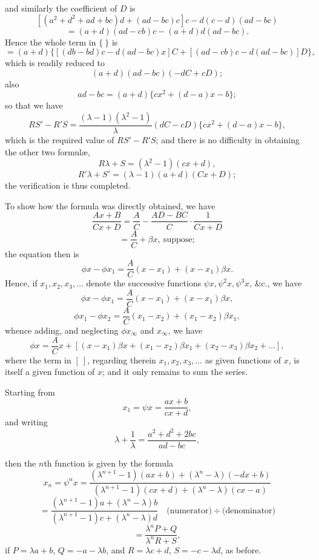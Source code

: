 \documentclass[11pt,a4paper]{article}
\begin{document}
\newpage


and similarly the coefficient of $D$ is
\[
[(a^{2} + d^{2} + ad + bc)d + (ad - bc)c]c - d(c - d)(ad - bc)
\]
\[
= (a + d)(ad - cb)c - (a + d)d(ad - bc).
\]
Hence the whole term in $\{\ \}$ is
\[
= (a + d)\{[(db - bd)c - d(ad - bc)x]C + [(ad - cb)c - d(ad - bc)]D\},
\]
which is readily reduced to
\[
(a + d)(ad - bc)(-dC + cD);
\]
also
\[
ad - bc = (a + d)\{cx^{2} + (d - a)x - b\};
\]
so that we have
\[
RS' - R'S = \frac{(\lambda - 1)(\lambda^{2} - 1)}{\lambda}(dC - cD)\{cx^{2} + (d - a)x - b\},
\]
which is the required value of $RS' - R'S$; and there is no difficulty in obtaining the other two formul\ae{},
\[
R\lambda + S = (\lambda^{2} - 1)(cx + d),
\]
\[
R'\lambda + S' = (\lambda - 1)(a + d)(Cx + D);
\]
the verification is thus completed.

\medskip

To show how the formula was directly obtained, we have
\[
\frac{Ax + B}{Cx + D} = \frac{A}{C} - \frac{AD - BC}{C}\cdot\frac{1}{Cx + D}
\]
\[
= \frac{A}{C} + \beta x,\ \text{suppose};
\]
the equation then is
\[
\phi x - \phi x_{1} = \frac{A}{C}(x - x_{1}) + (x - x_{1})\beta x.
\]
Hence, if $x_{1}, x_{2}, x_{3}, \ldots$ denote the successive functions $\psi x, \psi^{2}x, \psi^{3}x$, \&c., we have
\[
\phi x - \phi x_{1} = \frac{A}{C}(x - x_{1}) + (x - x_{1})\beta x,
\]
\[
\phi x_{1} - \phi x_{2} = \frac{A}{C}(x_{1} - x_{2}) + (x_{1} - x_{2})\beta x_{1},
\]
whence adding, and neglecting $\phi x_{\infty}$ and $x_{\infty}$, we have
\[
\phi x = \frac{A}{C}x + [(x - x_{1})\beta x + (x_{1} - x_{2})\beta x_{1} + (x_{2} - x_{3})\beta x_{2} + \ldots],
\]
where the term in $[\ ]$, regarding therein $x_{1}, x_{2}, x_{3}, \ldots$ as given functions of $x$, is itself a given function of $x$; and it only remains to sum the series.

\medskip

Starting from
\[
x_{1} = \psi x = \frac{ax + b}{cx + d},
\]
and writing
\[
\lambda + \frac{1}{\lambda} = \frac{a^{2} + d^{2} + 2bc}{ad - bc},
\]

\newpage


then the $n$th function is given by the formula
\[
x_{n} = \psi^{n}x = \frac{(\lambda^{n+1} - 1)(ax + b) + (\lambda^{n} - \lambda)(-dx + b)}{(\lambda^{n+1} - 1)(cx + d) + (\lambda^{n} - \lambda)(cx - a)}
\]
\[
= \frac{(\lambda^{n+1} - 1)a + (\lambda^{n} - \lambda)b}{(\lambda^{n+1} - 1)c + (\lambda^{n} - \lambda)d}\quad\text{(numerator)}\div\text{(denominator)}
\]
\[
= \frac{\lambda^{n}P + Q}{\lambda^{n}R + S},
\]
if $P = \lambda a + b$, $Q = -a - \lambda b$, and $R = \lambda c + d$, $S = -c - \lambda d$, as before.
\end{document}
